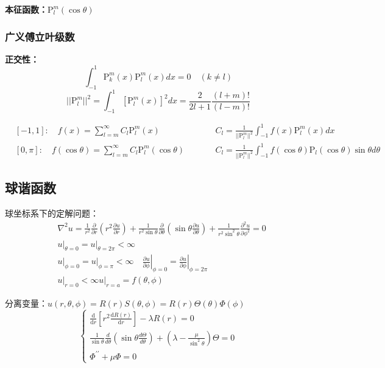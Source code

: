 \textbf{本征函数：}$\mathrm{P}_l^m(\cos\theta)$

\subsubsection{广义傅立叶级数}
\noindent \textbf{正交性：}
$$\int_{-1}^1\mathrm{P}_k^m(x)\mathrm{P}_l^m(x)dx=0\quad(k\ne l)$$
$$||\mathrm{P}_{l}^{m}||^{2}=\int_{-1}^{1}[\mathrm{P}_{l}^{m}(x)]^{2}dx=\frac{2}{2l+1}\frac{(l+m)!}{(l-m)!}$$

$$\begin{aligned}
&[-1,1]:\quad f(x)=\sum_{l=m}^\infty C_l\mathrm{P}_l^m(x)\qquad &&C_l=\frac{1}{||\mathrm{P}_l^m||^2}\int_{-1}^1f(x)\mathrm{P}_l^m(x)dx\\
&[0,\pi]:\quad f(\cos\theta)=\sum_{l=m}^\infty C_l\mathrm{P}_l^m(\cos\theta)\qquad&&C_l=\frac{1}{||\mathrm{P}_l^m||^2}\int_{-1}^1f(\cos\theta)\mathrm{P}_l(\cos\theta)\sin\theta d\theta
\end{aligned}$$

\subsection{球谐函数}
\label{Spherical Harmonics}
\noindent 球坐标系下的定解问题：
$$\begin{aligned}
    &\nabla^2u=\frac1{r^2}\frac\partial{\partial r}\left(r^2\frac{\partial u}{\partial r}\right)+\frac1{r^2\sin\theta}\frac\partial{\partial\theta}\left(\sin\theta\frac{\partial u}{\partial\theta}\right)+\frac1{r^2\sin^2\theta}\frac{\partial^2u}{\partial\phi^2}=0 \\
    &\left.u\right|_{\theta=0}=\left.u\right|_{\theta=2\pi}<\infty\\
    &\left.u\right|_{\phi=0}=\left.u\right|_{\phi=\pi}<\infty\quad\left.\frac{\partial u}{\partial\phi}\right|_{\phi=0}=\left.\frac{\partial u}{\partial\phi}\right|_{\phi=2\pi} \\
    &\left.u\right|_{r=0}<\infty\left.u\right|_{r=a}=f(\theta,\phi)
    \end{aligned}$$

\noindent 分离变量：$u(r,\theta,\phi)=R(r)S(\theta,\phi)=R(r)\Theta(\theta)\Phi(\phi)$
$$\begin{cases}
    \frac{\mathrm{d}}{\mathrm{d}r}\left[r^2\frac{\mathrm{d}R(r)}{\mathrm{d}r}\right]-\lambda R(r)=0\\
    \frac{1}{\sin\theta}\frac{d}{d\theta}\left(\sin\theta \frac{d\Theta}{d\theta}\right)+\left(\lambda-\frac{\mu}{\sin^2\theta}\right)\Theta=0\\
    \Phi^{\prime\prime}+\mu\Phi=0
\end{cases}$$


